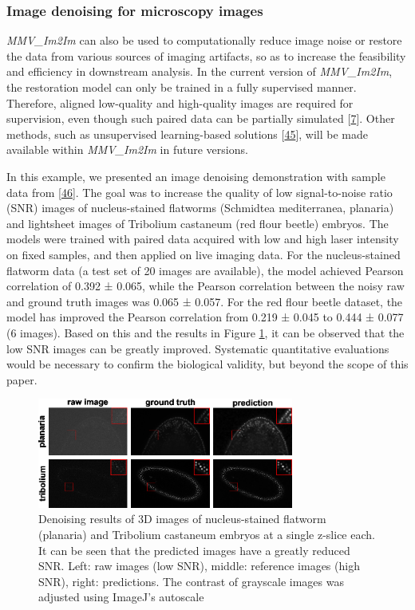 \hypertarget{image-denoising-for-microscopy-images}{%
\subsubsection{Image denoising for microscopy images}\label{image-denoising-for-microscopy-images}}

\emph{MMV\_Im2Im} can also be used to computationally reduce image noise or restore the data from various sources of imaging artifacts, so as to increase the feasibility and efficiency in downstream analysis. In the current version of \emph{MMV\_Im2Im}, the restoration model can only be trained in a fully supervised manner. Therefore, aligned low-quality and high-quality images are required for supervision, even though such paired data can be partially simulated {[}\protect\hyperlink{ref-wcCVn8av}{7}{]}. Other methods, such as unsupervised learning-based solutions {[}\protect\hyperlink{ref-4vnyY9J9}{45}{]}, will be made available within \emph{MMV\_Im2Im} in future versions.

In this example, we presented an image denoising demonstration with sample data from {[}\protect\hyperlink{ref-12G712Zky}{46}{]}. The goal was to increase the quality of low signal-to-noise ratio (SNR) images of nucleus-stained flatworms (Schmidtea mediterranea, planaria) and lightsheet images of Tribolium castaneum (red flour beetle) embryos. The models were trained with paired data acquired with low and high laser intensity on fixed samples, and then applied on live imaging data. For the nucleus-stained flatworm data (a test set of 20 images are available), the model achieved Pearson correlation of 0.392 ± 0.065, while the Pearson correlation between the noisy raw and ground truth images was 0.065 ± 0.057. For the red flour beetle dataset, the model has improved the Pearson correlation from 0.219 ± 0.045 to 0.444 ± 0.077 (6 images). Based on this and the results in Figure \ref{fig:denoising}, it can be observed that the low SNR images can be greatly improved. Systematic quantitative evaluations would be necessary to confirm the biological validity, but beyond the scope of this paper.

\begin{figure}
\hypertarget{fig:denoising}{%
\centering
\includegraphics[width=0.75\textwidth,height=\textheight]{images/denoising_justin.png}
\caption{Denoising results of 3D images of nucleus-stained flatworm (planaria) and Tribolium castaneum embryos at a single z-slice each. It can be seen that the predicted images have a greatly reduced SNR. Left: raw images (low SNR), middle: reference images (high SNR), right: predictions. The contrast of grayscale images was adjusted using ImageJ's autoscale}\label{fig:denoising}
}
\end{figure}

